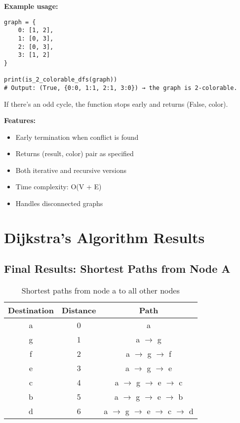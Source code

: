\documentclass[12pt,a4paper]{article}
\begin{document}
\textbf{Example usage:}
\begin{lstlisting}[caption=Example Usage, label=lst:example_usage]
graph = {
    0: [1, 2],
    1: [0, 3],
    2: [0, 3],
    3: [1, 2]
}

print(is_2_colorable_dfs(graph))
# Output: (True, {0:0, 1:1, 2:1, 3:0}) → the graph is 2-colorable.
\end{lstlisting}

If there's an odd cycle, the function stops early and returns (False, color).

\textbf{Features:}
\begin{itemize}
\item Early termination when conflict is found
\item Returns (result, color) pair as specified
\item Both iterative and recursive versions
\item Time complexity: O(V + E)
\item Handles disconnected graphs
\end{itemize}

\section{Dijkstra's Algorithm Results}

\subsection{Final Results: Shortest Paths from Node A}

\begin{table}[h]
\centering
\begin{tabular}{ccc}
\toprule
Destination & Distance & Path \\
\midrule
a & 0 & a \\
g & 1 & a $\rightarrow$ g \\
f & 2 & a $\rightarrow$ g $\rightarrow$ f \\
e & 3 & a $\rightarrow$ g $\rightarrow$ e \\
c & 4 & a $\rightarrow$ g $\rightarrow$ e $\rightarrow$ c \\
b & 5 & a $\rightarrow$ g $\rightarrow$ e $\rightarrow$ b \\
d & 6 & a $\rightarrow$ g $\rightarrow$ e $\rightarrow$ c $\rightarrow$ d \\
\bottomrule
\end{tabular}
\caption{Shortest paths from node a to all other nodes}
\end{table}
\end{document}
